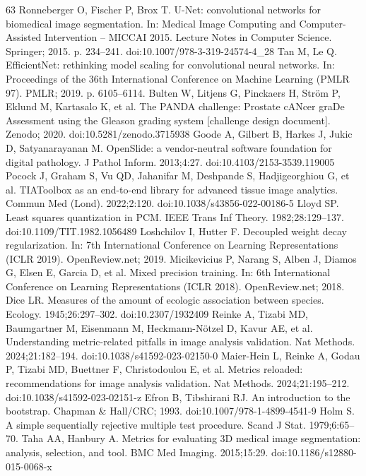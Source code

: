\documentclass[10pt,letterpaper]{article}
\begin{document}
\begin{thebibliography}{63}
 Ronneberger O, Fischer P, Brox T. U-Net: convolutional networks for biomedical image segmentation. In: Medical Image Computing and Computer-Assisted Intervention -- MICCAI 2015. Lecture Notes in Computer Science. Springer; 2015. p. 234--241. doi:10.1007/978-3-319-24574-4\_28
 Tan M, Le Q. EfficientNet: rethinking model scaling for convolutional neural networks. In: Proceedings of the 36th International Conference on Machine Learning (PMLR 97). PMLR; 2019. p. 6105--6114.
 Bulten W, Litjens G, Pinckaers H, Str\"om P, Eklund M, Kartasalo K, et al. The PANDA challenge: Prostate cANcer graDe Assessment using the Gleason grading system [challenge design document]. Zenodo; 2020. doi:10.5281/zenodo.3715938
 Goode A, Gilbert B, Harkes J, Jukic D, Satyanarayanan M. OpenSlide: a vendor-neutral software foundation for digital pathology. J Pathol Inform. 2013;4:27. doi:10.4103/2153-3539.119005
 Pocock J, Graham S, Vu QD, Jahanifar M, Deshpande S, Hadjigeorghiou G, et al. TIAToolbox as an end-to-end library for advanced tissue image analytics. Commun Med (Lond). 2022;2:120. doi:10.1038/s43856-022-00186-5
 Lloyd SP. Least squares quantization in PCM. IEEE Trans Inf Theory. 1982;28:129--137. doi:10.1109/TIT.1982.1056489
 Loshchilov I, Hutter F. Decoupled weight decay regularization. In: 7th International Conference on Learning Representations (ICLR 2019). OpenReview.net; 2019.
 Micikevicius P, Narang S, Alben J, Diamos G, Elsen E, Garcia D, et al. Mixed precision training. In: 6th International Conference on Learning Representations (ICLR 2018). OpenReview.net; 2018.
 Dice LR. Measures of the amount of ecologic association between species. Ecology. 1945;26:297--302. doi:10.2307/1932409
 Reinke A, Tizabi MD, Baumgartner M, Eisenmann M, Heckmann-N\"otzel D, Kavur AE, et al. Understanding metric-related pitfalls in image analysis validation. Nat Methods. 2024;21:182--194. doi:10.1038/s41592-023-02150-0
 Maier-Hein L, Reinke A, Godau P, Tizabi MD, Buettner F, Christodoulou E, et al. Metrics reloaded: recommendations for image analysis validation. Nat Methods. 2024;21:195--212. doi:10.1038/s41592-023-02151-z
 Efron B, Tibshirani RJ. An introduction to the bootstrap. Chapman \& Hall/CRC; 1993. doi:10.1007/978-1-4899-4541-9
 Holm S. A simple sequentially rejective multiple test procedure. Scand J Stat. 1979;6:65--70.
 Taha AA, Hanbury A. Metrics for evaluating 3D medical image segmentation: analysis, selection, and tool. BMC Med Imaging. 2015;15:29. doi:10.1186/s12880-015-0068-x

\end{thebibliography}
\end{document}
